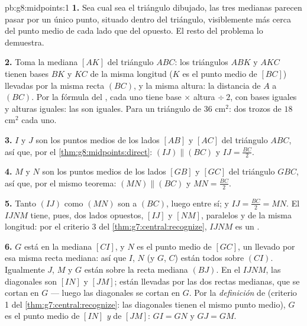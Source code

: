 \begin{solution}{pb:g8:midpoints:1}
\textbf{1.} Sea cual sea el triángulo dibujado, las tres medianas parecen
pasar por un único punto, situado dentro del triángulo,
visiblemente más cerca del punto medio de cada lado que del
 opuesto. El resto del problema lo demuestra.

\textbf{2.} Toma la mediana $[AK]$ del triángulo $ABC$: los
triángulos $ABK$ y $AKC$ tienen bases $BK$ y $KC$ de la misma
longitud ($K$ es el punto medio de $[BC]$) llevadas por la misma recta
$(BC)$, y la misma altura: la distancia de $A$ a $(BC)$.
Por la fórmula del , cada uno tiene 
base $\times$ altura $\div\ 2$, con bases iguales y alturas
iguales: las  son iguales. Para un triángulo de 
$36$ cm$^2$: dos trozos de $18$ cm$^2$ cada uno.

\textbf{3.} $I$ y $J$ son los puntos medios de los lados $[AB]$ y
$[AC]$ del triángulo $ABC$, así que, por el
\cref{thm:g8:midpoints:direct}: $(IJ) \parallel (BC)$ y
$IJ = \frac{BC}{2}$.

\textbf{4.} $M$ y $N$ son los puntos medios de los lados $[GB]$ y
$[GC]$ del triángulo $GBC$, así que, por el mismo teorema:
$(MN) \parallel (BC)$ y $MN = \frac{BC}{2}$.

\textbf{5.} Tanto $(IJ)$ como $(MN)$ son  a $(BC)$, luego
 entre sí; y $IJ = \frac{BC}{2} = MN$. El
 $IJNM$ tiene, pues, dos lados opuestos, $[IJ]$ y
$[NM]$, paralelos y de la misma longitud: por el criterio 3 del
\cref{thm:g7:central:recognize}, $IJNM$ es un .

\textbf{6.} $G$ está en la mediana $[CI]$, y $N$ es el
punto medio de $[GC]$, un  llevado por esa misma recta mediana:
así que $I$, $N$ (y $G$, $C$) están todos sobre $(CI)$. Igualmente $J$, $M$
y $G$ están sobre la recta mediana $(BJ)$. En el 
$IJNM$, las diagonales son $[IN]$ y $[JM]$; están llevadas por
las dos rectas medianas, que se cortan en $G$ --- luego las diagonales
se cortan en $G$. Por la \emph{definición} de 
(criterio 1 del \cref{thm:g7:central:recognize}: las diagonales
tienen el mismo punto medio), $G$ es el punto medio de $[IN]$ \emph{y}
de $[JM]$: $GI = GN$ y $GJ = GM$.


\end{solution}
